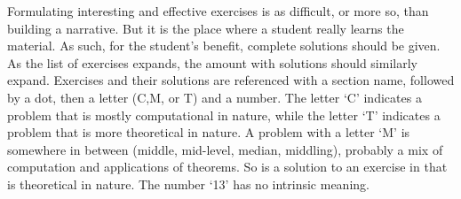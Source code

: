 %
Formulating interesting and effective exercises is as difficult, or more so, than building a narrative.  But it is the place where a student really learns the material.  As such, for the student's benefit, complete solutions should be given.  As the list of exercises expands, the amount with solutions should similarly expand.  Exercises and their solutions are referenced with a section name, followed by a dot, then a letter (C,M, or T) and a number.   The letter `C' indicates a problem that is mostly computational in nature, while the letter `T' indicates a problem that is more theoretical in nature.  A problem with a letter `M' is somewhere in between (middle, mid-level, median, middling), probably a mix of computation and applications of theorems.  So  is a solution to an exercise in  that is theoretical in nature.  The number `13' has no intrinsic meaning.\par
%
